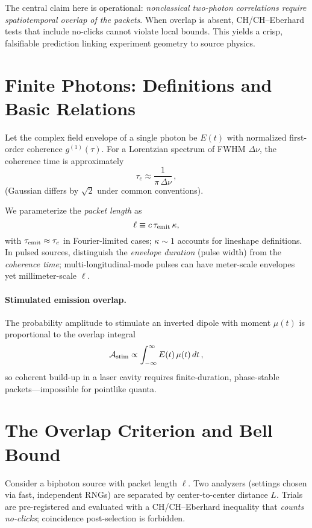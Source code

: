 \documentclass[reprint,aps,prl,nofootinbib,superscriptaddress]{revtex4-2}
\begin{document}
The central claim here is operational: \emph{nonclassical two-photon correlations require spatiotemporal overlap of the packets}. When overlap is absent, CH/CH--Eberhard tests that include no-clicks cannot violate local bounds. This yields a crisp, falsifiable prediction linking experiment geometry to source physics.

\section{Finite Photons: Definitions and Basic Relations}
Let the complex field envelope of a single photon be $E(t)$ with normalized first-order coherence $g^{(1)}(\tau)$. For a Lorentzian spectrum of FWHM $\Delta \nu$, the coherence time is approximately
\begin{equation}
\tau_c \approx \frac{1}{\pi\,\Delta \nu}\,,
\end{equation}
(Gaussian differs by $\sqrt{2}$ under common conventions).

We parameterize the \emph{packet length} as
\begin{equation}
\ell \equiv c \,\tau_{\rm emit}\,\kappa,
\end{equation}
with $\tau_{\rm emit} \approx \tau_c$ in Fourier-limited cases; $\kappa \sim 1$ accounts for lineshape definitions. In pulsed sources, distinguish the \emph{envelope duration} (pulse width) from the \emph{coherence time}; multi-longitudinal-mode pulses can have meter-scale envelopes yet millimeter-scale $\ell$.

\paragraph*{Stimulated emission overlap.}
The probability amplitude to stimulate an inverted dipole with moment $\mu(t)$ is proportional to the overlap integral
\begin{equation}
\mathcal{A}_{\rm stim} \propto \int_{-\infty}^{\infty} E(t)\,\mu(t)\,dt\,,
\end{equation}
so coherent build-up in a laser cavity requires finite-duration, phase-stable packets---impossible for pointlike quanta.


\section{The Overlap Criterion and Bell Bound}
Consider a biphoton source with packet length $\ell$. Two analyzers (settings chosen via fast, independent RNGs) are separated by center-to-center distance $L$. Trials are pre-registered and evaluated with a CH/CH--Eberhard inequality that \emph{counts no-clicks}; coincidence post-selection is forbidden.
\end{document}

